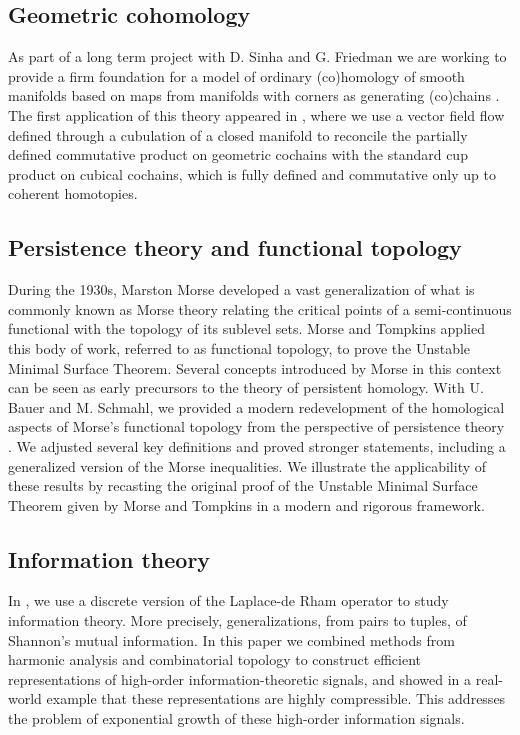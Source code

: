 \subsection{Geometric cohomology} \label{ss:flows}

As part of a long term project with D. Sinha and G. Friedman we are working to provide a firm foundation for a model of ordinary (co)homology of smooth manifolds based on maps from manifolds with corners as generating (co)chains \cite{medina2021foundations}.
The first application of this theory appeared in \cite{medina2021flowing}, where we use a vector field flow defined through a cubulation of a closed manifold to reconcile the partially defined commutative product on geometric cochains with the standard cup product on cubical cochains, which is fully defined and commutative only up to coherent homotopies.

\subsection{Persistence theory and functional topology}

During the 1930s, Marston Morse developed a vast generalization of what is commonly known as Morse theory relating the critical points of a semi-continuous functional with the topology of its sublevel sets.
Morse and Tompkins applied this body of work, referred to as functional topology, to prove the Unstable Minimal Surface Theorem.
Several concepts introduced by Morse in this context can be seen as early precursors to the theory of persistent homology.
With U. Bauer and M. Schmahl, we provided a modern redevelopment of the homological aspects of Morse's functional topology from the perspective of persistence theory \cite{medina2021functional}.
We adjusted several key definitions and proved stronger statements, including a generalized version of the Morse inequalities.
We illustrate the applicability of these results by recasting the original proof of the Unstable Minimal Surface Theorem given by Morse and Tompkins in a modern and rigorous framework.

\subsection{Information theory}

In \cite{medina2021hyperharmonic}, we use a discrete version of the Laplace-de Rham operator to study information theory.
More precisely, generalizations, from pairs to tuples, of Shannon's mutual information.
In this paper we combined methods from harmonic analysis and combinatorial topology to construct efficient representations of high-order information-theoretic signals, and showed in a real-world example that these representations are highly compressible.
This addresses the problem of exponential growth of these high-order information signals.
